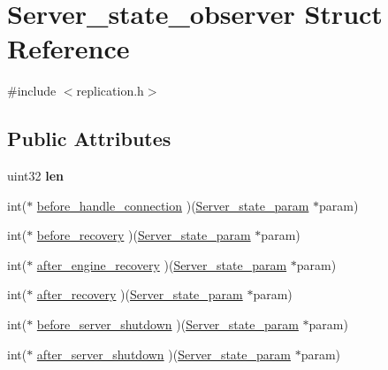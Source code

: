 \hypertarget{structServer__state__observer}{}\section{Server\+\_\+state\+\_\+observer Struct Reference}
\label{structServer__state__observer}


{\ttfamily \#include $<$replication.\+h$>$}

\subsection*{Public Attributes}
\begin{DoxyCompactItemize}
\item 
\mbox{\label{structServer__state__observer_ab065bea53f1e8a43225c4ad8be05a4a1}} 
uint32 {\bfseries len}
\item 
int($\ast$ \mbox{\hyperlink{structServer__state__observer_a9f28a4ddbee0e830bf910a4e396257db}{before\+\_\+handle\+\_\+connection}} )(\mbox{\hyperlink{structServer__state__param}{Server\+\_\+state\+\_\+param}} $\ast$param)
\item 
int($\ast$ \mbox{\hyperlink{structServer__state__observer_ab56f500a600af06249a14f51fc6a8243}{before\+\_\+recovery}} )(\mbox{\hyperlink{structServer__state__param}{Server\+\_\+state\+\_\+param}} $\ast$param)
\item 
int($\ast$ \mbox{\hyperlink{structServer__state__observer_a771b6a4ff00a09b67cff5aea530c653b}{after\+\_\+engine\+\_\+recovery}} )(\mbox{\hyperlink{structServer__state__param}{Server\+\_\+state\+\_\+param}} $\ast$param)
\item 
int($\ast$ \mbox{\hyperlink{structServer__state__observer_a38fea82c3736104783402e90603c102a}{after\+\_\+recovery}} )(\mbox{\hyperlink{structServer__state__param}{Server\+\_\+state\+\_\+param}} $\ast$param)
\item 
int($\ast$ \mbox{\hyperlink{structServer__state__observer_aed8f8cbeb5187866528560b6b7a67c5c}{before\+\_\+server\+\_\+shutdown}} )(\mbox{\hyperlink{structServer__state__param}{Server\+\_\+state\+\_\+param}} $\ast$param)
\item 
int($\ast$ \mbox{\hyperlink{structServer__state__observer_a0c19c60426a1a6cf48bd7023e848da32}{after\+\_\+server\+\_\+shutdown}} )(\mbox{\hyperlink{structServer__state__param}{Server\+\_\+state\+\_\+param}} $\ast$param)
\end{DoxyCompactItemize}


